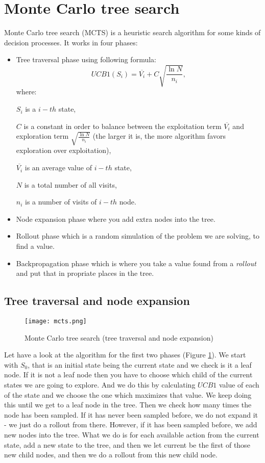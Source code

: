 \documentclass[12pt]{article}
\begin{document}
\section{Monte Carlo tree search}
Monte Carlo tree search (MCTS) is a heuristic search algorithm for some kinds of decision processes. It works in four phases:
\begin{itemize}
\item Tree traversal phase using following formula:
\[
    UCB1(S_i) = \overline{V_i} + C \sqrt{\frac{\ln{N}}{n_i}} ,
\]
where:

$S_i$ is a $i-th$ state,

$C$ is a constant in order to balance between the exploitation term $\overline{V_i}$ and exploration term $\sqrt{\frac{\ln{N}}{n_i}}$ (the larger it is, the more algorithm favors exploration over exploitation),

$\overline{V_i}$ is an average value of $i-th$ state,

$N$ is a total number of all visits,

$n_i$ is a number of visits of $i-th$ node.

\item Node expansion phase where you add extra nodes into the tree.
\item Rollout phase which is a random simulation of the problem we are solving, to find a value.
\item Backpropagation phase which is where you take a value found from a \textit{rollout} and put that in propriate places in the tree.
\end{itemize}

\subsection{Tree traversal and node expansion}
\begin{figure}
\centering
\texttt{[image: mcts.png]}
\caption{Monte Carlo tree search (tree traversal and node expansion)}
\label{fig:mcts}
\end{figure}

Let have a look at the algorithm for the first two phases (Figure \ref{fig:mcts}).
We start with $S_0$, that is an initial state being the current state and we check is it a leaf node. If it is not a leaf node then you have to choose which child of the current states we are going to explore. And we do this by calculating $UCB1$ value of each of the state and we choose the one which maximizes that value. We keep doing this until we get to a leaf node in the tree. Then we check how many times the node has been sampled. If it has never been sampled before, we do not expand it - we just do a rollout from there. However, if it has been sampled before, we add new nodes into the tree. What we do is for each available action from the current state, add a new state to the tree, and then we let current be the first of those new child nodes, and then we do a rollout from this new child node.
\end{document}
